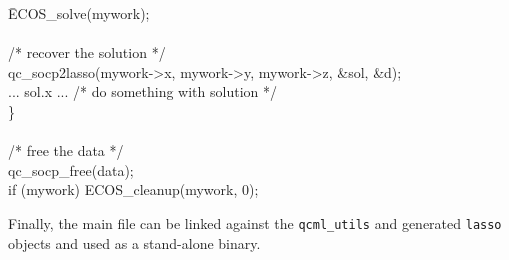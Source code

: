 \documentclass[11pt]{article}
\begin{document}
{\begin{tabbing}
\> \quad \= ECOS\_solve(mywork);\\
\\
\> \> /* recover the solution */ \\
\> \> qc\_socp2lasso(mywork->x, mywork->y, mywork->z, \&sol, \&d);\\
\> \> ... sol.x ... /* do something with solution */\\
\> \}\\
\\
\> /* free the data */ \\
\> qc\_socp\_free(data);\\
\> if (mywork) ECOS\_cleanup(mywork, 0);
\end{tabbing}
}

Finally, the main file can be linked against the {\tt qcml\_utils} and
generated {\tt lasso} objects and used as a stand-alone binary.




\end{document}
